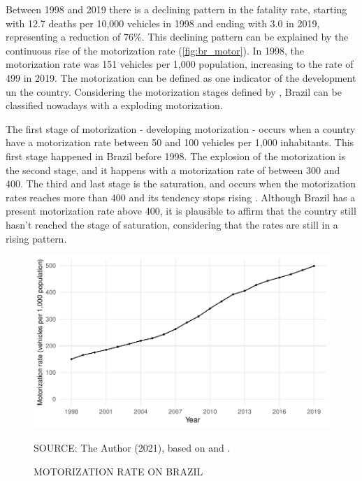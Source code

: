 Between 1998 and 2019 there is a declining pattern in the fatality rate, starting with 12.7 deaths per 10,000 vehicles in 1998 and ending with 3.0 in 2019, representing a reduction of 76\%. This declining pattern can be explained by the continuous rise of the motorization rate (\autoref{fig:br_motor}). In 1998, the motorization rate was 151 vehicles per 1,000 population, increasing to the rate of 499 in 2019. The motorization can be defined as one indicator of the development un the country. Considering the motorization stages defined by \textcite{Jorgensen2005}, Brazil can be classified nowadays with a exploding motorization. 

The first stage of motorization - developing motorization - occurs when a country have a motorization rate between 50 and 100 vehicles per 1,000 inhabitants. This first stage happened in Brazil before 1998. The explosion of the motorization is the second stage, and it happens with a motorization rate of between 300 and 400. The third and last stage is the saturation, and occurs when the motorization rates reaches more than 400 and its tendency stops rising \cite{Jorgensen2005}. Although Brazil has a present motorization rate above 400, it is plausible to affirm that the country still hasn't reached the stage of saturation, considering that the rates are still in a rising pattern. 


\begin{figure}[!htbp]
    \centering\footnotesize
    \captionsetup{font=footnotesize}
    \caption{MOTORIZATION RATE ON BRAZIL}
    \includegraphics{fig/brazil_motor.pdf}
    \label{fig:br_motor}
    \par SOURCE: The Author (2021), based on \textcite{MinistryofHealth2021} and \textcite{DENATRAN2020}.
\end{figure} 

